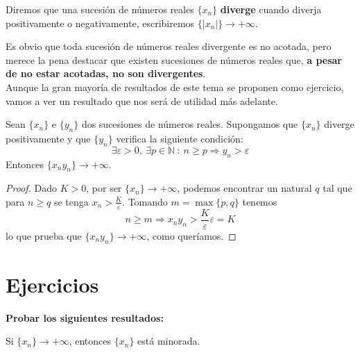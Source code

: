 \begin{definicion}
    Diremos que una sucesión de números reales $\{x_n\}$ \textbf{diverge} cuando diverja positivamente o negativamente, escribiremos $\{|x_n|\} \longrightarrow + \infty$.
\end{definicion}

Es obvio que toda sucesión de números reales divergente es no acotada, pero merece la pena destacar que existen sucesiones de números reales que, \textbf{a pesar de no estar acotadas, no son divergentes}.\\

Aunque la gran mayoría de resultados de este tema se proponen como ejercicio, vamos a ver un resultado
que nos será de utilidad más adelante.
\begin{teo}\label{teo:7.1.4}
    Sean $\{x_n\}$ e $\{y_n\}$ dos sucesiones de números reales. Supongamos que $\{x_n\}$ diverge positivamente y que $\{y_n\}$ verifica la siguiente condición:
    \begin{equation*}
        \exists \varepsilon > 0, ~ \exists p \in \mathbb{N} ~:~ n \geq p \Longrightarrow y_n > \varepsilon
    \end{equation*}
    Entonces $\{x_n y_n\} \longrightarrow + \infty$.
\end{teo}
\begin{proof}
    Dado $K > 0$, por ser $\{x_n\} \longrightarrow + \infty$, podemos encontrar un natural $q$ tal que para $n \geq q$ se tenga $x_n > \frac{K}{\varepsilon}$. Tomando $m = \max \{p,q\}$ tenemos
    \begin{equation*}
        n \geq m \Longrightarrow x_n y_n > \frac{K}{\varepsilon} \varepsilon = K
    \end{equation*}
    lo que prueba que $\{x_n y_n\} \longrightarrow + \infty$, como queríamos.
\end{proof}



\section{Ejercicios}

\textbf{Probar los siguientes resultados:}
\begin{ejercicio}
    Si $\{x_n\} \longrightarrow +\infty$, entonces $\{x_n\}$ está minorada.
\end{ejercicio}

